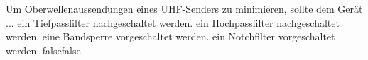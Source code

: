     {Um Oberwellenaussendungen eines UHF-Senders zu minimieren, sollte dem Gerät ...}
    {ein Tiefpassfilter nachgeschaltet werden.}
    {ein Hochpassfilter nachgeschaltet werden.}
    {eine Bandsperre vorgeschaltet werden.}
    {ein Notchfilter vorgeschaltet werden.}
    {false}{false}